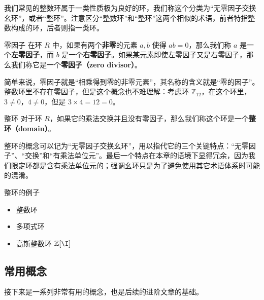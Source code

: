 
\begin{issues}
\end{issues}





我们常见的整数环属于一类性质极为良好的环，我们称这个分类为“无零因子交换幺环”，或者“整环”。注意区分“整数环”和“整环”这两个相似的术语，前者特指整数构成的环，后者则指一类环。

\begin{definition}{零因子}\label{def_Domain_1}
在环 $R$ 中，如果有两个\textbf{非零}的元素 $a, b$ 使得 $ab=0$，那么我们称 $a$ 是一个\textbf{左零因子}，而 $b$ 是一个\textbf{右零因子}。如果某元素即使左零因子又是右零因子，那么我们称它是一个\textbf{零因子（zero divisor）}。
\end{definition}

简单来说，零因子就是“相乘得到零的非零元素”，其名称的含义就是“零的因子”。整数环里不存在零因子，但是这个概念也不难理解：考虑环 $\mathbb{Z}_{12}$，在这个环里，$3\not=0$，$4\not=0$，但是 $3\times 4=12=0$。

\begin{definition}{整环}
对于环 $R$，如果它的乘法交换并且没有零因子，那么我们称这个环是一个\textbf{整环（domain）}。
\end{definition}

整环的概念可以记为“无零因子交换幺环”，用以指代它的三个关键特点：“无零因子”、“交换”和“有乘法单位元”。最后一个特点在本章的语境下显得冗余，因为我们限定环都是含有乘法单位元的；强调幺环只是为了避免使用其它术语体系时可能的混淆。

\begin{example}{整环的例子}
\begin{itemize}
\item 整数环
\item 多项式环
\item 高斯整数环 $\mathbb{Z}[\I]$
\end{itemize}

\end{example}

\subsection{常用概念}

接下来是一系列非常有用的概念，也是后续的进阶文章的基础。


